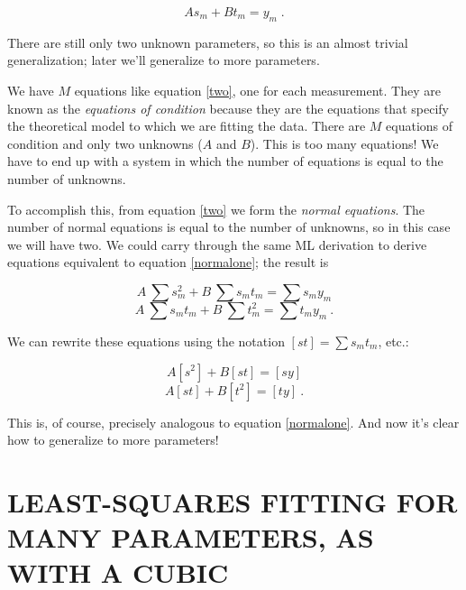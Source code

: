 \documentclass[psfig,preprint]{aastex}
\begin{document}
\begin{equation} \label{two}
A s_m + B t_m = y_m \; .
\end{equation}

\noindent There are still only two unknown parameters, so this is an
almost trivial generalization; later we'll generalize to more
parameters.

	We have $M$ equations like equation \ref{two}, one for each
measurement.  They are known as the {\it equations of condition} because
they are the equations that specify the theoretical model to which we
are fitting the data. There are $M$ equations of condition and only two
unknowns ($A$ and $B$).  This is too many equations! We have to end up
with a system in which the number of equations is equal to the number of
unknowns.

	To accomplish this, from equation \ref{two} we form the {\it
normal equations}.  The number of normal equations is equal to the
number of unknowns, so in this case we will have two.   We could carry
through the same ML derivation to derive equations equivalent to
equation \ref{normalone}; the result is

\begin{mathletters} \label{ones}
\begin{equation}
A\ \sum s_m^2 + B \ \sum s_m t_m = \sum s_m y_m
\end{equation}
\begin{equation}
A \ \sum s_m t_m + B \ \sum t_m^2  = \sum t_m y_m \ .
\end{equation}
\end{mathletters}

\noindent We can rewrite these equations using the notation $[st] =
\sum s_m t_m$, etc.:

\begin{mathletters} \label{normaltwo}
\begin{equation}
A [ s^2 ] + B [ s t ] = [ s y ]
\end{equation}
\begin{equation}
A [ s t ] + B [ t^2 ] = [ t y ] \ .
\end{equation}
\end{mathletters}

\noindent This is, of course, precisely analogous to equation
\ref{normalone}. And now it's clear how to generalize to more
parameters!

\section{LEAST-SQUARES FITTING FOR MANY PARAMETERS, AS WITH A CUBIC}
\label{sectiontwo}
\end{document}
